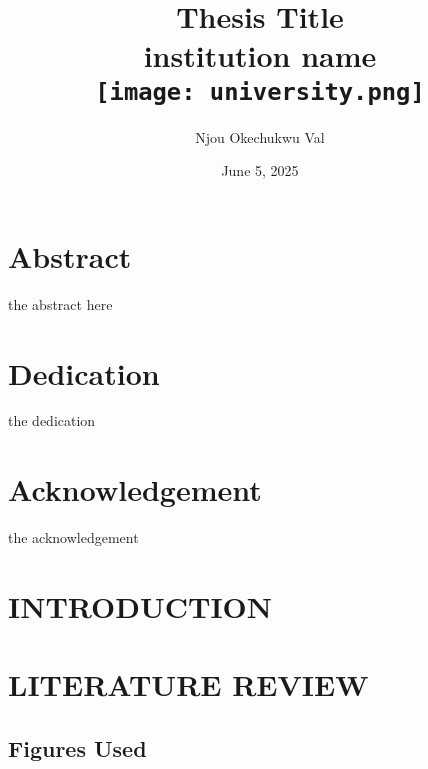 \documentclass[12pt]{report}
\title{
	{Thesis Title}\\
	{\large institution name}\\
	{\texttt{[image: university.png]}}
}
\author{Njou Okechukwu Val}
\date{June 5, 2025}
\begin{document}
		
	\chapter*{Abstract}
	the abstract here 
	
	\chapter*{Dedication}
	the dedication
	
	\chapter*{Acknowledgement}
	the acknowledgement
	
	\tableofcontents
	\listoffigures
	\listoftables
	
	\chapter{INTRODUCTION}
	
	
	\chapter{LITERATURE REVIEW}
	
	
	
	
	
	\section*{Figures Used}
	
	
	
	
\end{document}
